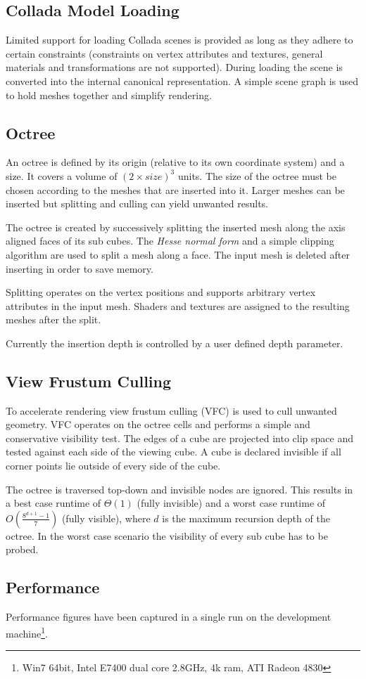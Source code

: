 \documentclass[a4, 12pt]{scrartcl}
\begin{document}
\subsection{Collada Model Loading}
Limited support for loading Collada scenes is provided as long as they adhere to certain constraints (constraints on vertex attributes and textures, general materials and transformations are not supported). During loading the scene is converted into the internal canonical representation. A simple scene graph is used to hold meshes together and simplify rendering.

\subsection{Octree}
An octree is defined by its origin (relative to its own coordinate system) and a size. It covers a volume of $(2 \times size )^3$ units. The size of the octree must be chosen according to the meshes that are inserted into it. Larger meshes can be inserted but splitting and culling can yield unwanted results.

The octree is created by successively splitting the inserted mesh along the axis aligned faces of its sub cubes. The \emph{Hesse normal form} and a simple clipping algorithm are used to split a mesh along a face. The input mesh is deleted after inserting in order to save memory.

Splitting operates on the vertex positions and supports arbitrary vertex attributes in the input mesh. Shaders and textures are assigned to the resulting meshes after the split.

Currently the insertion depth is controlled by a user defined depth parameter. 

\subsection{View Frustum Culling}
To accelerate rendering view frustum culling (VFC) is used to cull unwanted geometry. VFC operates on the octree cells and performs a simple and conservative visibility test. The edges of a cube are projected into clip space and tested against each side of the viewing cube. A cube is declared invisible if all corner points lie outside of every side of the cube. 

The octree is traversed top-down and invisible nodes are ignored. This results in a best case runtime of $\Theta(1)$ (fully invisible) and a worst case runtime of $O(\frac{8^{d+1} - 1}{7})$ (fully visible), where $d$ is the maximum recursion depth of the octree. In the worst case scenario the visibility of every sub cube has to be probed.

\subsection{Performance}
Performance figures have been captured in a single run on the development machine\footnote{Win7 64bit, Intel E7400 dual core 2.8GHz, 4k ram, ATI Radeon 4830}.













\end{document}
